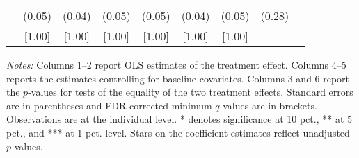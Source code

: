 \begin{table}[h]
{\begin{threeparttable}
\begin{tabular}{l*{8}{c}}
          &   (0.05)&   (0.04)&   (0.05)&   (0.05)&   (0.04)&   (0.05)&   (0.28)&         \\
          &   [1.00]&   [1.00]&   [1.00]&   [1.00]&   [1.00]&   [1.00]&         &         \\
\bottomrule \end{tabular} \begin{tablenotes}[flushleft] \footnotesize \item \emph{Notes:} Columns 1--2 report OLS estimates of the treatment effect. Columns 4--5 reports the estimates controlling for baseline covariates. Columns 3 and 6 report the \(p\)-values for tests of the equality of the two treatment effects. Standard errors are in parentheses and FDR-corrected minimum \(q\)-values are in brackets. Observations are at the individual level. * denotes significance at 10 pct., ** at 5 pct., and *** at 1 pct. level. Stars on the coefficient estimates reflect unadjusted \(p\)-values. \end{tablenotes} \end{threeparttable} } \end{table}

